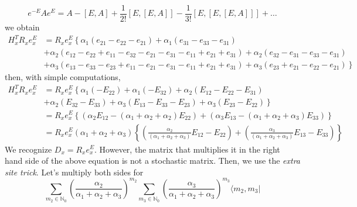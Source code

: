 \documentclass[11pt]{article}
\numberwithin{equation}{subsection}
\begin{document}
\begin{equation}
	e^{-E}Ae^{E}=A-\left[E,A\right]+\frac{1}{2!}\left[E,\left[E,A\right]\right]-\frac{1}{3!}\left[E,\left[E,\left[E,A\right]\right]\right]+\ldots
\end{equation}
we obtain 
\begin{equation}
	\begin{split}
	H^{T}_{x}R_{x}e_{x}^{E}&=R_{x}e_{x}^{E}\left\{\alpha_{1}\left(e_{21}-e_{22}-e_{21}\right)+\alpha_{1}\left(e_{31}-e_{33}-e_{31}\right)\right. \\ &+ \left. \alpha_{2}\left(e_{12}-e_{22}+e_{11}-e_{32}-e_{21}-e_{31}-e_{11}+e_{21}+e_{31}\right)+\alpha_{2}\left(e_{32}-e_{31}-e_{33}-e_{31}\right)\right. \\&+\left.
	\alpha_{3}\left(e_{13}-e_{33}-e_{23}+e_{11}-e_{21}-e_{31}-e_{11}+e_{21}+e_{31}\right)+\alpha_{3}\left(e_{23}+e_{21}-e_{22}-e_{21}\right)\right\}
	\end{split}
\end{equation}
then, with simple computations,
\begin{equation}\label{nonStochDuality}
	\begin{split}
	H^{T}_{x}R_{x}e_{x}^{E}&=R_{x}e_{x}^{E}\left\{\alpha_{1}(-E_{22})+\alpha_{1}(-E_{32})+\alpha_{2}(E_{12}-E_{22}-E_{31})\right.\\&+\left. \alpha_{2}(E_{32}-E_{33})+\alpha_{3}(E_{13}-E_{33}-E_{23})+\alpha_{3}(E_{23}-E_{22})\right\}\\&=
	R_{x}e_{x}^{E}\left\{\left(\alpha_{2}E_{12}-(\alpha_{1}+\alpha_{2}+\alpha_{2})E_{22}\right)+\left(\alpha_{3}E_{13}-(\alpha_{1}+\alpha_{2}+\alpha_{3})E_{33}\right)\right\}
	\\&=
	R_{x}e_{x}^{E}(\alpha_{1}+\alpha_{2}+\alpha_{3})\left\{\left(\frac{\alpha_{2}}{(\alpha_{1}+\alpha_{2}+\alpha_{3})}E_{12}-E_{22}\right)+\left(\frac{\alpha_{3}}{(\alpha_{1}+\alpha_{2}+\alpha_{3})}E_{13}-E_{33}\right)\right\}
\end{split}
\end{equation}
We recognize $D_{x}=R_{x}e^{E}_{x}$. However, the matrix that multiplies it in the right hand side of the above equation is not a stochastic matrix. Then, we use the \textit{extra site trick}. 
Let's multiply both sides for 
\begin{equation}
\sum_{m_{2}\in\mathbb{N}_{0}}	\left(\frac{\alpha_{2}}{\alpha_{1}+\alpha_{2}+\alpha_{3}}\right)^{m_{2}}\sum_{m_{3}\in \mathbb{N}_{0}}\left(\frac{\alpha_{3}}{\alpha_{1}+\alpha_{2}+\alpha_{3}}\right)^{m_{3}}\langle m_{2},m_{3}|
\end{equation}
\end{document}
